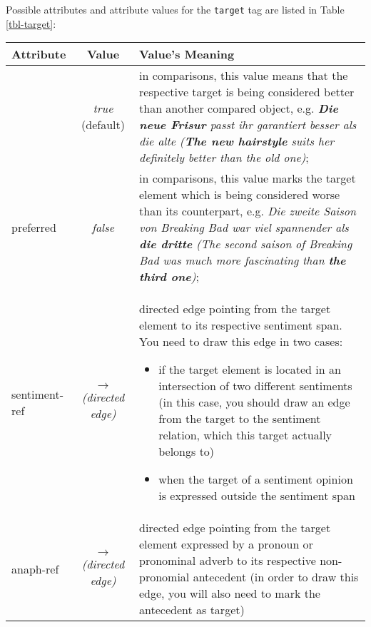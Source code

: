 \documentclass[11pt,a4paper]{article}
\newlength\clmnwidth
\begin{document}
Possible attributes and attribute values for the \texttt{target} tag are
listed in Table \ref{tbl-target}:
\begin{center}
  \begin{tabular}{|l|c|p{\clmnwidth}|}\hline
    Attribute & Value & Value's Meaning\\\hline\label{tbl-target}

    & \textit{true} (default) & in comparisons, this value means that the
    respective target is being considered better than another compared object,
    e.g. \textit{\textbf{Die neue Frisur} passt ihr garantiert besser als die
      alte (\textbf{The new hairstyle} suits her definitely better than the
      old one)};\\\cline{2-3}

    \multirow{-2}{*}{preferred} & \textit{false} & in
    comparisons, this value marks the target element which is being
    considered worse than its counterpart, e.g. \textit{Die zweite
      Saison von Breaking Bad war viel spannender als \textbf{die
        dritte} (The second saison of Breaking Bad was much more
      fascinating than \textbf{the third one})};\\\hline

    sentiment-ref & \textit{$\longrightarrow$\newline(directed edge)} &
    directed edge pointing from the target element to its respective sentiment
    span.  You need to draw this edge in two cases:
    \begin{itemize}
    \item if the target element is located in an intersection of two different
      sentiments (in this case, you should draw an edge from the target to the
      sentiment relation, which this target actually belongs to)

    \item when the target of a sentiment opinion is expressed outside the
      sentiment span
    \end{itemize}\\\hline

    anaph-ref & \textit{$\longrightarrow$\newline(directed edge)} & directed
    edge pointing from the target element expressed by a pronoun or pronominal
    adverb to its respective non-pronomial antecedent (in order to draw this
    edge, you will also need to mark the antecedent as target)\\\hline
  \end{tabular}
\end{center}
\end{document}
